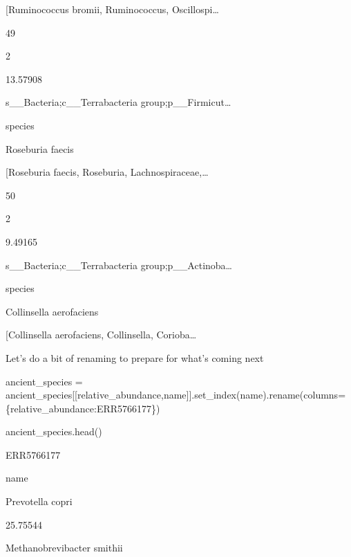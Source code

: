 \documentclass[
  letterpaper,
]{book}
\newenvironment{Shaded}{}{}
\newcommand{\NormalTok}[1]{\textcolor[rgb]{0.14,0.16,0.18}{#1}}
\newcommand{\OperatorTok}[1]{\textcolor[rgb]{0.14,0.16,0.18}{#1}}
\newcommand{\StringTok}[1]{\textcolor[rgb]{0.01,0.18,0.38}{#1}}
\begin{document}
{[}Ruminococcus bromii, Ruminococcus, Oscillospi\ldots{}

49

2

13.57908

s\_\_Bacteria;c\_\_Terrabacteria group;p\_\_Firmicut\ldots{}

species

Roseburia faecis

{[}Roseburia faecis, Roseburia, Lachnospiraceae,\ldots{}

50

2

9.49165

s\_\_Bacteria;c\_\_Terrabacteria group;p\_\_Actinoba\ldots{}

species

Collinsella aerofaciens

{[}Collinsella aerofaciens, Collinsella, Corioba\ldots{}

Let's do a bit of renaming to prepare for what's coming next

\begin{Shaded}
\begin{Highlighting}[]
\NormalTok{ancient\_species }\OperatorTok{=}\NormalTok{ ancient\_species[[}\StringTok{\textquotesingle{}relative\_abundance\textquotesingle{}}\NormalTok{,}\StringTok{\textquotesingle{}name\textquotesingle{}}\NormalTok{]].set\_index(}\StringTok{\textquotesingle{}name\textquotesingle{}}\NormalTok{).rename(columns}\OperatorTok{=}\NormalTok{\{}\StringTok{\textquotesingle{}relative\_abundance\textquotesingle{}}\NormalTok{:}\StringTok{\textquotesingle{}ERR5766177\textquotesingle{}}\NormalTok{\})}
\end{Highlighting}
\end{Shaded}

\begin{Shaded}
\begin{Highlighting}[]
\NormalTok{ancient\_species.head()}
\end{Highlighting}
\end{Shaded}

ERR5766177

name

Prevotella copri

25.75544

Methanobrevibacter smithii
\end{document}
